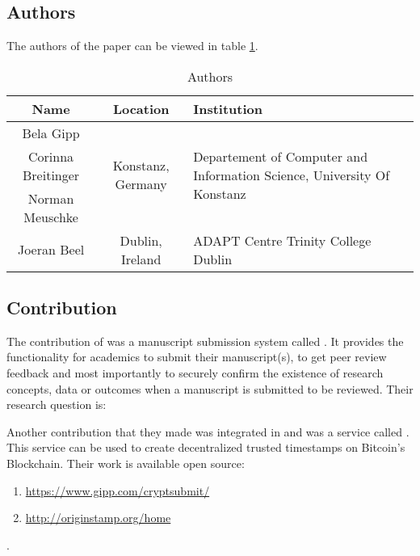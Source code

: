 

\section*{\citet{2017_Gipp}}

\subsection*{Authors}
The authors of the paper can be viewed in table \ref{tab:2017_Gipp_Authors}.
\begin{longtable}{ |c|c|p{5cm}| }
	\caption{Authors} \label{tab:2017_Gipp_Authors} \\
	\hline
 	\cellcolor{Gray}Name & \cellcolor{Gray}Location & \cellcolor{Gray}Institution \\ [0.5ex] 
 	\hline\hline
 	\endhead
	 Bela Gipp &  \multirow{3}{*}{Konstanz, Germany} & \multirow{3}{*}{\parbox{5cm}{\centering Departement of Computer and Information Science, University Of Konstanz}} \\
	 \cline{1-1}
	 Corinna Breitinger &  & \\
	 \cline{1-1}
	 Norman Meuschke &  & \\
	 \hline
	 Joeran Beel & Dublin, Ireland & ADAPT Centre Trinity College Dublin \\
	\hline
\end{longtable}


\subsection*{Contribution}
The contribution of \citet{2017_Gipp} was a manuscript submission system called . It provides the functionality for academics to submit their manuscript(s), to get peer review feedback and most importantly to securely confirm the existence of research concepts, data or outcomes when a manuscript is submitted to be reviewed. Their research question is:
\begin{displayquote}
\end{displayquote}
Another contribution that they made was integrated in  and was a service called . This service can be used to create decentralized trusted timestamps on Bitcoin's Blockchain.
Their work is available open source:
\begin{enumerate}[label={\arabic*)},font={\color{red!50!black}\bfseries}]
	\item {} \url{https://www.gipp.com/cryptsubmit/}
	\item {} \url{http://originstamp.org/home}
\end{enumerate}.

